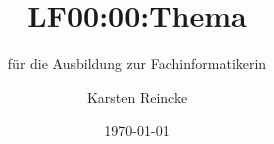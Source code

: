 \documentclass[]{beamer}
\title{LF00:00:Thema}
\subtitle{für die Ausbildung zur Fachinformatikerin}
\institute[GS-LDK]{Gewerbliche Schulen Dillenburg}
\author{Karsten Reincke}
\date{\today}
\def\cfgGl{../../../cfg.gl/}
\begin{document}

\begin{frame}
  \titlepage

  
\end{frame}








\logo{}
\newpage




\end{document}
